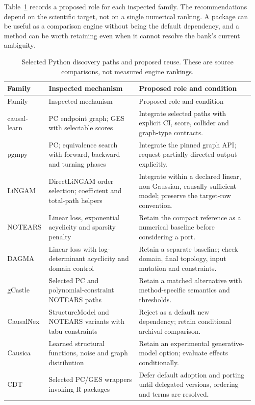 Table~\ref{tab:exec13-pydisc} records a proposed role for each inspected family.
The recommendations depend on the scientific target, not on a single numerical
ranking. A package can be useful as a comparison engine without being the
default dependency, and a method can be worth retaining even when it cannot
resolve the bank's current ambiguity.

\begingroup\small
\begin{longtable}{p{}p{}p{}}
\caption{Selected Python discovery paths and proposed reuse. These are source
comparisons, not measured engine rankings.}\label{tab:exec13-pydisc}\\
\toprule Family & Inspected mechanism & Proposed role and condition \\
\midrule\endfirsthead
\toprule Family & Inspected mechanism & Proposed role and condition \\
\midrule\endhead
causal-learn & PC endpoint graph; GES with selectable scores & Integrate selected
paths with explicit CI, score, collider and graph-type contracts. \\
pgmpy & PC; equivalence search with forward, backward and turning phases &
Integrate the pinned graph API; request partially directed output explicitly. \\
LiNGAM & DirectLiNGAM order selection; coefficient and total-path helpers &
Integrate within a declared linear, non-Gaussian, causally sufficient model;
preserve the target-row convention. \\
NOTEARS & Linear loss, exponential acyclicity and sparsity penalty & Retain
the compact reference as a numerical baseline before considering a port. \\
DAGMA & Linear loss with log-determinant acyclicity and domain control & Retain
a separate baseline; check domain, final topology, input mutation and constraints. \\
gCastle & Selected PC and polynomial-constraint NOTEARS paths & Retain a
matched alternative with method-specific semantics and thresholds. \\
CausalNex & StructureModel and NOTEARS variants with tabu constraints & Reject
as a default new dependency; retain conditional archival comparison. \\
Causica & Learned structural functions, noise and graph distribution & Retain
an experimental generative-model option; evaluate effects conditionally. \\
CDT & Selected PC/GES wrappers invoking R packages & Defer default adoption
and porting until delegated versions, ordering and terms are resolved. \\
\bottomrule
\end{longtable}
\endgroup

